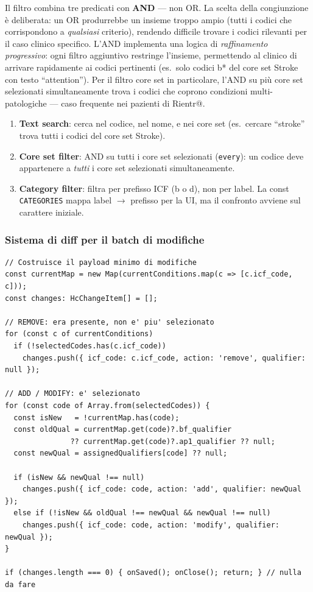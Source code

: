 \documentclass[a4paper,12pt]{article}
\begin{document}
\noindent Il filtro combina tre predicati con \textbf{AND} --- non OR.
La scelta della congiunzione \`{e} deliberata: un OR produrrebbe un insieme
troppo ampio (tutti i codici che corrispondono a \textit{qualsiasi} criterio),
rendendo difficile trovare i codici rilevanti per il caso clinico specifico.
L'AND implementa una logica di \textit{raffinamento progressivo}: ogni filtro
aggiuntivo restringe l'insieme, permettendo al clinico di arrivare rapidamente
ai codici pertinenti (es.\ solo codici b* del core set Stroke con testo
``attention''). Per il filtro core set in particolare, l'AND su pi\`{u}
core set selezionati simultaneamente trova i codici che coprono condizioni
multi-patologiche --- caso frequente nei pazienti di Rientr@.
\begin{enumerate}[noitemsep]
  \item \textbf{Text search}: cerca nel codice, nel nome, e nei core set
        (es.\ cercare ``stroke'' trova tutti i codici del core set Stroke).
  \item \textbf{Core set filter}: AND su tutti i core set selezionati
        (\texttt{every}): un codice deve appartenere a \textit{tutti}
        i core set selezionati simultaneamente.
  \item \textbf{Category filter}: filtra per prefisso ICF (b o d), non
        per label. La const \texttt{CATEGORIES} mappa label $\rightarrow$
        prefisso per la UI, ma il confronto avviene sul carattere iniziale.
\end{enumerate}

\subsubsection{Sistema di diff per il batch di modifiche}
\vspace{2pt}
\begin{lstlisting}
// Costruisce il payload minimo di modifiche
const currentMap = new Map(currentConditions.map(c => [c.icf_code, c]));
const changes: HcChangeItem[] = [];

// REMOVE: era presente, non e' piu' selezionato
for (const c of currentConditions)
  if (!selectedCodes.has(c.icf_code))
    changes.push({ icf_code: c.icf_code, action: 'remove', qualifier: null });

// ADD / MODIFY: e' selezionato
for (const code of Array.from(selectedCodes)) {
  const isNew   = !currentMap.has(code);
  const oldQual = currentMap.get(code)?.bf_qualifier
               ?? currentMap.get(code)?.ap1_qualifier ?? null;
  const newQual = assignedQualifiers[code] ?? null;

  if (isNew && newQual !== null)
    changes.push({ icf_code: code, action: 'add', qualifier: newQual });
  else if (!isNew && oldQual !== newQual && newQual !== null)
    changes.push({ icf_code: code, action: 'modify', qualifier: newQual });
}

if (changes.length === 0) { onSaved(); onClose(); return; } // nulla da fare
\end{lstlisting}
\end{document}
